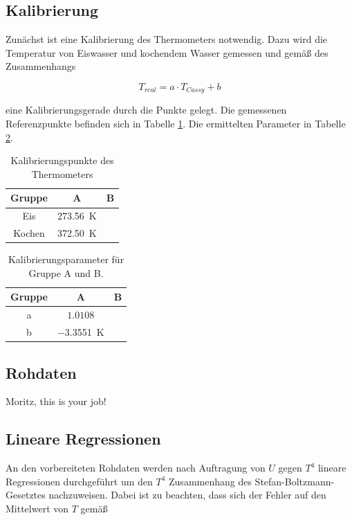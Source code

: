 \documentclass[12pt,a4paper]{article}
\begin{document}
\subsection{Kalibrierung}
Zunächst ist eine Kalibrierung des Thermometers notwendig. Dazu wird die Temperatur von Eiswasser und kochendem Wasser gemessen und gemäß des Zusammenhangs
 
\begin{equation}
T_{real} = a \cdot T_{Cassy} + b
\end{equation}

eine Kalibrierungsgerade durch die Punkte gelegt. Die gemessenen Referenzpunkte befinden sich in Tabelle \ref{tab:Kalibrierung}. Die ermittelten Parameter in Tabelle \ref{tab:Parameter}.

\begin{table}
\centering
\begin{tabular}{|c|c|c|}
\hline
Gruppe & A & B \\
\hline
Eis & \SI{273.56}{\K} & \\
\hline
Kochen & \SI{372.50}{\K} & \\
\hline 
\end{tabular}
\caption{Kalibrierungspunkte des Thermometers}
\label{tab:Kalibrierung}
\end{table}

\begin{table}
\centering
\begin{tabular}{|c|c|c|}
\hline
Gruppe & A & B \\
\hline
a & $1.0108$ & \\
\hline
b & \SI{-3.3551}{\K} & \\
\hline
\end{tabular}
\caption{Kalibrierungsparameter für Gruppe A und B.}
\label{tab:Parameter}
\end{table}

\subsection{Rohdaten}
Moritz, this is your job!


\subsection{Lineare Regressionen}
An den vorbereiteten Rohdaten werden nach Auftragung von $U$ gegen $T^4$ lineare Regressionen durchgeführt um den $T^4$ Zusammenhang des Stefan-Boltzmann-Gesetztes nachzuweisen. Dabei ist zu beachten, dass sich der Fehler auf den Mittelwert von $T$ gemäß 
\end{document}
